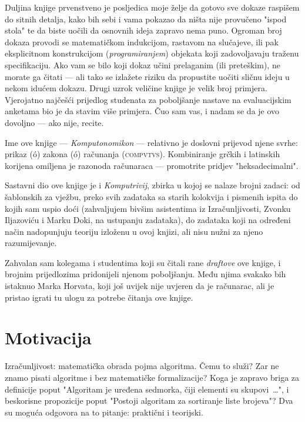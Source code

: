 Duljina knjige prvenstveno je posljedica moje želje da gotovo sve dokaze raspišem do sitnih detalja, kako bih sebi i vama pokazao da ništa nije provučeno "ispod stola" te da biste uočili da osnovnih ideja zapravo nema puno. Ogroman broj dokaza provodi se matematičkom indukcijom, rastavom na slučajeve, ili pak eksplicitnom konstrukcijom (\emph{programiranjem}) objekata koji zadovoljavaju traženu specifikaciju. Ako vam se bilo koji dokaz učini prelaganim (ili preteškim), ne morate ga čitati --- ali tako se izlažete riziku da propustite uočiti sličnu ideju u nekom idućem dokazu. Drugi uzrok veličine knjige je velik broj primjera. Vjerojatno najčešći prijedlog studenata za poboljšanje nastave na evaluacijskim anketama bio je da stavim više primjera. Čuo sam vas, i nadam se da je ovo dovoljno --- ako nije, recite.

Ime ove knjige --- \emph{Komputonomikon} --- relativno je doslovni prijevod njene svrhe: prikaz ({\textgreekfont\textepsilon\textiota\textkappa\'o\textnu\textalpha}) zakona ({\textgreekfont\textnu\'o\textmugreek\textomikron\textvarsigma}) računanja (\textsc{compvtvs}). Kombiniranje grčkih i latinskih korijena omiljena je razonoda računaraca --- promotrite pridjev "heksadecimalni".

Sastavni dio ove knjige je i \emph{Komputrivij}, zbirka u kojoj se nalaze brojni zadaci: od šablonskih za vježbu, preko svih zadataka sa starih kolokvija i pismenih ispita do kojih sam uspio doći (zahvaljujem bivšim asistentima iz Izračunljivosti, Zvonku Iljazoviću i Marku Doki, na ustupanju zadataka), do zadataka koji na određeni način nadopunjuju teoriju izloženu u ovoj knjizi, ali nisu nužni za njeno razumijevanje.

Zahvalan sam kolegama i studentima koji su čitali rane \emph{draftove} ove knjige, i brojnim prijedlozima pridonijeli njenom poboljšanju. Među njima svakako bih istaknuo Marka Horvata, koji još uvijek nije uvjeren da je računarac, ali je pristao igrati tu ulogu za potrebe čitanja ove knjige.

\section{Motivacija}

Izračunljivost: matematička obrada pojma algoritma. Čemu to služi? Zar ne znamo pisati algoritme i bez matematičke formalizacije? Koga je zapravo briga za definicije poput "Algoritam je uređena sedmorka, čiji elementi su skupovi~\ldots", i beskorisne propozicije poput "Postoji algoritam za sortiranje liste brojeva"? Dva su moguća odgovora na to pitanje: praktični i teorijski.

